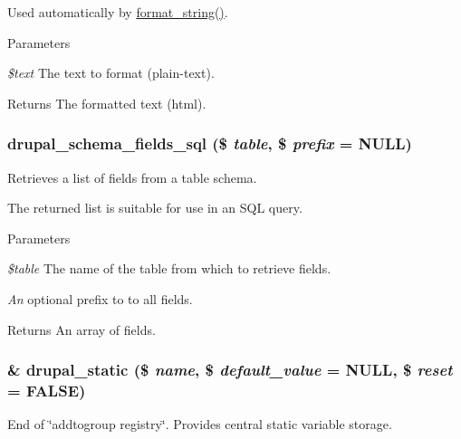 Used automatically by \hyperlink{group__sanitization_ga8da272cf93fb6ba229eca7c0b06ea4d2}{format\_\-string()}.


\begin{DoxyParams}{Parameters}
\item[{\em \$text}]The text to format (plain-\/text).\end{DoxyParams}
\begin{DoxyReturn}{Returns}
The formatted text (html). 
\end{DoxyReturn}
\hypertarget{group__schemaapi_gaacfcd6f676ee9062f0ba50a008a05443}{
\subsubsection[{drupal\_\-schema\_\-fields\_\-sql}]{\setlength{\rightskip}{0pt plus 5cm}drupal\_\-schema\_\-fields\_\-sql (\$ {\em table}, \/  \$ {\em prefix} = {\ttfamily NULL})}}
\label{group__schemaapi_gaacfcd6f676ee9062f0ba50a008a05443}
Retrieves a list of fields from a table schema.

The returned list is suitable for use in an SQL query.


\begin{DoxyParams}{Parameters}
\item[{\em \$table}]The name of the table from which to retrieve fields. \item[{\em An}]optional prefix to to all fields.\end{DoxyParams}
\begin{DoxyReturn}{Returns}
An array of fields. 
\end{DoxyReturn}
\hypertarget{group__schemaapi_ga498392997d598f196f35805de85d8b21}{
\subsubsection[{drupal\_\-static}]{\setlength{\rightskip}{0pt plus 5cm}\& drupal\_\-static (\$ {\em name}, \/  \$ {\em default\_\-value} = {\ttfamily NULL}, \/  \$ {\em reset} = {\ttfamily FALSE})}}
\label{group__schemaapi_ga498392997d598f196f35805de85d8b21}
End of \char`\"{}addtogroup registry\char`\"{}. Provides central static variable storage.

